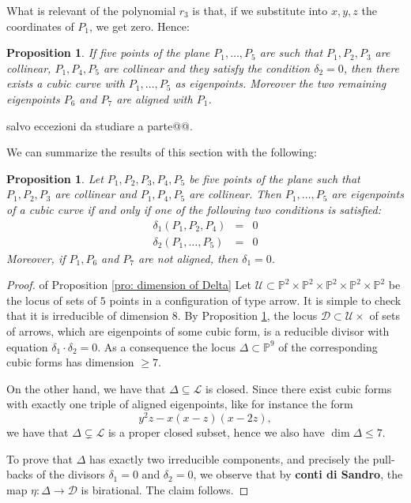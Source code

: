 \documentclass{amsart}
\theoremstyle{plain}
\newtheorem{prop}[theorem]{Proposition}
\theoremstyle{definition}
\newcommand{\p}{\mathbb{P}}
\newcommand{\sL}{\mathcal{L}}
\newcommand{\sU}{\mathcal{U}}
\newcommand{\sD}{\mathcal{D}}
\begin{document}
What is relevant of the polynomial $r_3$ is that, if we substitute into
$x, y, z$ the coordinates of $P_1$, we get zero. Hence:


\begin{prop}
If five points of the plane $P_1, \dots , P_5$
are such that $P_1, P_2, P_3$ are collinear,
$P_1, P_4, P_5$ are collinear and they satisfy the condition
$\delta_2 =0$, then there exists a cubic curve with $P_1, \dots, P_5$
as eigenpoints. Moreover the two remaining eigenpoints $P_6$ and $P_7$
are aligned with $P_1$.
\label{propX}
\end{prop}
salvo eccezioni da studiare a parte@@.


We can summarize the results of this section with the following:

\begin{prop}\label{pro: equations of 5 points}
  Let $P_1, P_2, P_3, P_4, P_5$ be five points of the plane such that
  $P_1, P_2, P_3$ are collinear and $P_1, P_4, P_5$ are collinear. Then
  $P_1, \dots, P_5$ are eigenpoints of a cubic curve if and only if
  one of the following two conditions is satisfied:
  \begin{eqnarray*}
    \delta_1(P_1, P_2, P_4) & = & 0\\
    \delta_2(P_1, \dots, P_5) & = & 0
  \end{eqnarray*}
  Moreover, if $P_1, P_6$ and $P_7$ are not aligned, then $\delta_1=0$.
  \label{freccia}
\end{prop}

\begin{proof} of Proposition \ref{pro: dimension of Delta}
Let $\sU \subset \p^2 \times \p^2 \times \p^2 \times \p^2 \times \p^2$ be the locus of sets of $5$ points in a configuration of type arrow. It is simple to check that it is irreducible of dimension $8$.
By Proposition \ref{pro: equations of 5 points}, the locus $\sD \subset \sU \times $ of sets of arrows, which are eigenpoints of some cubic form, is a reducible divisor with equation $\delta_1 \cdot \delta_2 =0$. As a consequence the locus $\Delta \subset \p^9$ of the corresponding cubic forms has dimension $ \ge 7$.

On the other hand, we have that $\Delta \subseteq \sL$ is closed. Since there exist cubic forms with exactly one triple of aligned eigenpoints, like for instance the form
$$
y^2 z - x (x-z)(x-2z),
$$
we have that $\Delta \subsetneq \sL$ is a proper closed subset, hence we also have $\dim \Delta \le 7$.

To prove that $\Delta$ has exactly two irreducible components, and precisely the pull-backs of the divisors $\delta_1=0$ and $\delta_2=0$, we observe that by {\bf conti di Sandro}, the map 
$\eta :\Delta \to \sD$ is birational. The claim follows.

\end{proof}
\end{document}
